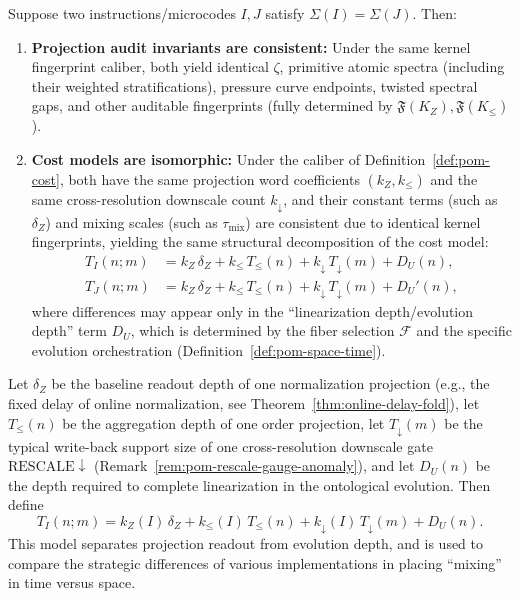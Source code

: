 \begin{proposition}\label{prop:pom-signature-audit}
Suppose two instructions/microcodes $I,J$ satisfy $\Sigma(I)=\Sigma(J)$. Then:
\begin{enumerate}
  \item \textbf{Projection audit invariants are consistent:} Under the same kernel fingerprint caliber, both yield identical $\zeta$, primitive atomic spectra (including their weighted stratifications), pressure curve endpoints, twisted spectral gaps, and other auditable fingerprints (fully determined by $\mathfrak{F}(K_Z),\mathfrak{F}(K_{\le})$).
  \item \textbf{Cost models are isomorphic:} Under the caliber of Definition~\ref{def:pom-cost}, both have the same projection word coefficients $(k_Z,k_{\le})$ and the same cross-resolution downscale count $k_{\downarrow}$, and their constant terms (such as $\delta_Z$) and mixing scales (such as $\tau_{\mathrm{mix}}$) are consistent due to identical kernel fingerprints, yielding the same structural decomposition of the cost model:
  $$
  \begin{aligned}
  T_I(n;m)&=k_Z\,\delta_Z+k_{\le}\,T_{\le}(n)+k_{\downarrow}\,T_{\downarrow}(m)+D_U(n),\\
  T_J(n;m)&=k_Z\,\delta_Z+k_{\le}\,T_{\le}(n)+k_{\downarrow}\,T_{\downarrow}(m)+D_U'(n),
  \end{aligned}
  $$
  where differences may appear only in the ``linearization depth/evolution depth'' term $D_U$, which is determined by the fiber selection $\mathcal{F}$ and the specific evolution orchestration (Definition~\ref{def:pom-space-time}).
\end{enumerate}
\end{proposition}

\begin{definition}\label{def:pom-cost}
Let $\delta_Z$ be the baseline readout depth of one normalization projection (e.g., the fixed delay of online normalization, see Theorem~\ref{thm:online-delay-fold}), let $T_{\le}(n)$ be the aggregation depth of one order projection, let $T_{\downarrow}(m)$ be the typical write-back support size of one cross-resolution downscale gate $\mathrm{RESCALE}\downarrow$ (Remark~\ref{rem:pom-rescale-gauge-anomaly}), and let $D_U(n)$ be the depth required to complete linearization in the ontological evolution. Then define
\[
T_I(n;m)=k_Z(I)\,\delta_Z+k_{\le}(I)\,T_{\le}(n)+k_{\downarrow}(I)\,T_{\downarrow}(m)+D_U(n).
\]
This model separates projection readout from evolution depth, and is used to compare the strategic differences of various implementations in placing ``mixing'' in time versus space.
\end{definition}

